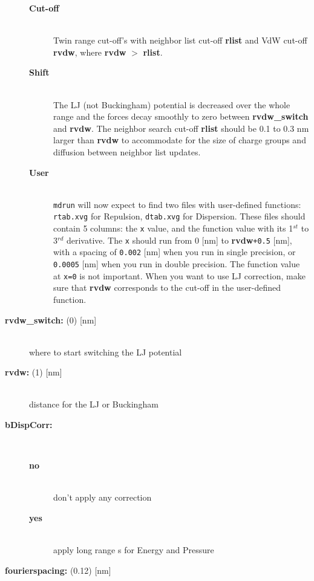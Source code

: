 \begin{description}
\vspace{-2ex}\begin{description}
\item[{\bf Cut-off}]\mbox{}\\
Twin range cut-off's with neighbor list cut-off {\bf rlist} and 
VdW cut-off {\bf rvdw},
where {\bf rvdw} {\tt $>$} {\bf rlist}.
\item[{\bf Shift}]\mbox{}\\
The LJ (not Buckingham) potential is decreased over the whole
range and the forces decay smoothly to zero between {\bf rvdw\_switch}
and {\bf rvdw}.  The neighbor search cut-off {\bf rlist} should be
0.1 to 0.3 nm larger than {\bf rvdw} to accommodate for the size of
charge groups and diffusion between neighbor list
updates.
\item[{\bf User}]\mbox{}\\
{\tt mdrun} will now expect to find two files with user-defined
functions: {\tt rtab.xvg} for Repulsion, {\tt dtab.xvg} for 
Dispersion. These files should contain 5 columns:
the {\tt x} value, and the function value with its 1$^{st}$
to 3$^{rd}$ derivative. The {\tt x} should run from 0 [nm] to
{\bf rvdw}{\tt +0.5} [nm], with a spacing of {\tt 0.002}
[nm] when you run in single precision, or {\tt 0.0005} [nm] when
you run in double precision. The function value at {\tt x=0} is not
important. When you want to use LJ correction, make sure that {\bf rvdw}
corresponds to the cut-off in the user-defined function.
\end{description}
\item[{\bf rvdw\_switch: }(0) {[nm]}]\mbox{}\\
where to start switching the LJ potential
\item[{\bf rvdw: }(1) {[nm]}]\mbox{}\\
distance for the LJ or Buckingham 
\item[{\bf bDispCorr:}]\mbox{}\\
\vspace{-2ex}\begin{description}
\item[{\bf no}]\mbox{}\\
don't apply any correction
\item[{\bf yes}]\mbox{}\\
apply long range s for Energy
and Pressure
\end{description}
\item[{\bf fourierspacing: }(0.12) {[nm]}]\mbox{}\\

\end{description}
